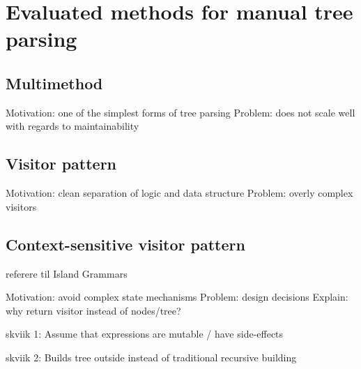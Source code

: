 \section{Evaluated methods for manual tree parsing}
\label{sect:method:evaluated_methods}

\subsection{Multimethod}
\label{sect:method:evaluated_methods}
Motivation: one of the simplest forms of tree parsing
Problem: does not scale well with regards to maintainability

\subsection{Visitor pattern}
\label{sect:method:evaluated_methods}
Motivation: clean separation of logic and data structure 
Problem: overly complex visitors

\subsection{Context-sensitive visitor pattern}
\label{sect:method:evaluated_methods}

referere til Island Grammars


Motivation: avoid complex state mechanisms
Problem: design decisions
Explain: why return visitor instead of nodes/tree?

skviik 1: Assume that expressions are mutable / have side-effects

skviik 2: Builds tree outside instead of traditional recursive building